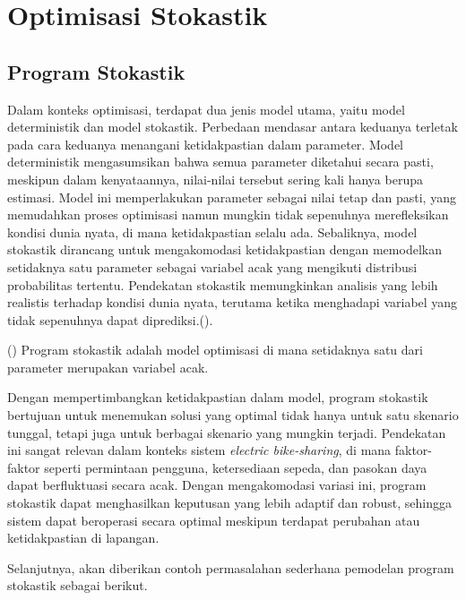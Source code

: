 \chapter{Optimisasi Stokastik}

\section{Program Stokastik}
Dalam konteks optimisasi, terdapat dua jenis model utama, yaitu model deterministik dan model stokastik. Perbedaan mendasar antara keduanya terletak pada cara keduanya menangani ketidakpastian dalam parameter. Model deterministik mengasumsikan bahwa semua parameter diketahui secara pasti, meskipun dalam kenyataannya, nilai-nilai tersebut sering kali hanya berupa estimasi. Model ini memperlakukan parameter sebagai nilai tetap dan pasti, yang memudahkan proses optimisasi namun mungkin tidak sepenuhnya merefleksikan kondisi dunia nyata, di mana ketidakpastian selalu ada. Sebaliknya, model stokastik dirancang untuk mengakomodasi ketidakpastian dengan memodelkan setidaknya satu parameter sebagai variabel acak yang mengikuti distribusi probabilitas tertentu. Pendekatan stokastik memungkinkan analisis yang lebih realistis terhadap kondisi dunia nyata, terutama ketika menghadapi variabel yang tidak sepenuhnya dapat diprediksi.().

\begin{definisi} ()
    Program stokastik adalah model optimisasi di mana setidaknya satu dari parameter merupakan variabel acak.
\end{definisi}

Dengan mempertimbangkan ketidakpastian dalam model, program stokastik bertujuan untuk menemukan solusi yang optimal tidak hanya untuk satu skenario tunggal, tetapi juga untuk berbagai skenario yang mungkin terjadi. Pendekatan ini sangat relevan dalam konteks sistem \textit{electric bike-sharing}, di mana faktor-faktor seperti permintaan pengguna, ketersediaan sepeda, dan pasokan daya dapat berfluktuasi secara acak. Dengan mengakomodasi variasi ini, program stokastik dapat menghasilkan keputusan yang lebih adaptif dan robust, sehingga sistem dapat beroperasi secara optimal meskipun terdapat perubahan atau ketidakpastian di lapangan.

Selanjutnya, akan diberikan contoh permasalahan sederhana pemodelan program stokastik sebagai berikut.


